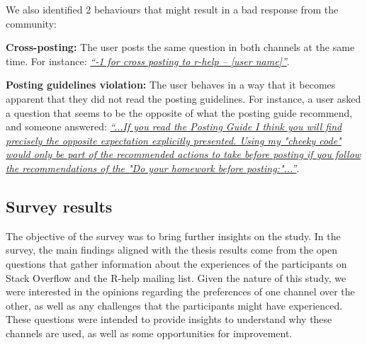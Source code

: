 \documentclass{sig-alternate-05-2015}
\begin{document}
	We also identified 2 behaviours that might result in a bad response from the community:
	\begin{packed_enum}
		\item \textbf{Cross-posting:} The user posts the same question in both channels at the same time.
		For instance: \textit{\href{http://goo.gl/ENKrVK}{``-1 for cross posting to r-help – [user name]''}}.
		\item \textbf{Posting guidelines violation:} The user behaves in a way that it becomes apparent that they did not read the posting guidelines.
		For instance, a user asked a question that seems to be the opposite of what the posting guide recommend, and someone answered: \textit{\href{http://goo.gl/FUm1HC}{``...If you read the Posting Guide I think you will find precisely the opposite expectation explicitly presented. Using my "cheeky code" would only be part of the recommended actions to take before posting if you follow the recommendations of the "Do your homework before posting:"...''}}.
	\end{packed_enum}

\subsection{Survey results}
\label{sec:survey}

The objective of the survey was to bring further insights on the study.
In the survey, the main findings aligned with the thesis results come from the open questions that gather information about the experiences of the participants on Stack Overflow and the R-help mailing list.
Given the nature of this study, we were interested in the opinions regarding the preferences of one channel over the other, as well as any challenges that the participants might have experienced.
These questions were intended to provide insights to understand why these channels are used, as well as some opportunities for improvement.

\end{document}
